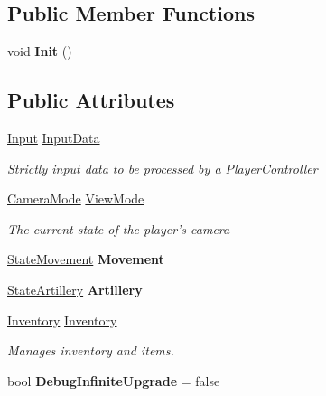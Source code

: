 \subsection*{Public Member Functions}
\begin{DoxyCompactItemize}
\item 
\hypertarget{class_skyrates_1_1_data_1_1_player_data_af10cea6b24d8183d5a8bf92ce84011b7}{void {\bfseries Init} ()}\label{class_skyrates_1_1_data_1_1_player_data_af10cea6b24d8183d5a8bf92ce84011b7}

\end{DoxyCompactItemize}
\subsection*{Public Attributes}
\begin{DoxyCompactItemize}
\item 
\hyperlink{struct_skyrates_1_1_data_1_1_player_data_1_1_input}{Input} \hyperlink{class_skyrates_1_1_data_1_1_player_data_aa94e7872cb93055601b695a0345b0ce6}{Input\-Data}
\begin{DoxyCompactList}\small\item\em Strictly input data to be processed by a Player\-Controller \end{DoxyCompactList}\item 
\hyperlink{class_skyrates_1_1_data_1_1_player_data_ac28ce79e15521123667443435b1554ea}{Camera\-Mode} \hyperlink{class_skyrates_1_1_data_1_1_player_data_a254a2270ea477c0841176b3797222f2a}{View\-Mode}
\begin{DoxyCompactList}\small\item\em The current state of the player's camera \end{DoxyCompactList}\item 
\hypertarget{class_skyrates_1_1_data_1_1_player_data_af2225347edc955b2d20ee05d37f55d90}{\hyperlink{class_skyrates_1_1_data_1_1_state_movement}{State\-Movement} {\bfseries Movement}}\label{class_skyrates_1_1_data_1_1_player_data_af2225347edc955b2d20ee05d37f55d90}

\item 
\hypertarget{class_skyrates_1_1_data_1_1_player_data_ac33cdbf8c73adfaab8b0cc90fddba7e4}{\hyperlink{class_skyrates_1_1_data_1_1_state_artillery}{State\-Artillery} {\bfseries Artillery}}\label{class_skyrates_1_1_data_1_1_player_data_ac33cdbf8c73adfaab8b0cc90fddba7e4}

\item 
\hyperlink{class_skyrates_1_1_data_1_1_inventory}{Inventory} \hyperlink{class_skyrates_1_1_data_1_1_player_data_ab182e7267c1d6f3f65a49fa2bc62cf4a}{Inventory}
\begin{DoxyCompactList}\small\item\em Manages inventory and items. \end{DoxyCompactList}\item 
\hypertarget{class_skyrates_1_1_data_1_1_player_data_adb247ac5f328f8c3a8b6db2990ff3364}{bool {\bfseries Debug\-Infinite\-Upgrade} = false}\label{class_skyrates_1_1_data_1_1_player_data_adb247ac5f328f8c3a8b6db2990ff3364}

\end{DoxyCompactItemize}


